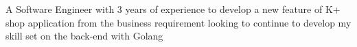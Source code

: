 


\begin{cvparagraph}


    A Software Engineer with 3 years of experience to develop a new feature of K+ shop application from the business requirement looking to continue to develop my skill set on the back-end with Golang

\end{cvparagraph}

